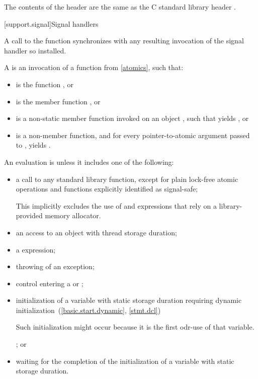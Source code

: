 \pnum
The contents of the header  are the same as the C
standard library header .

[support.signal]{Signal handlers}

\pnum
A call to the function  synchronizes with any resulting
invocation of the signal handler so installed.

\pnum
A  is
an invocation of a function  from \ref{atomics},
such that:
\begin{itemize}
\item
{} is the function , or

\item
{} is the member function , or

\item
{} is a non-static member function invoked on an object ,
such that  yields , or

\item
{} is a non-member function, and
for every pointer-to-atomic argument  passed to ,
 yields .
\end{itemize}

\pnum
{}%
An evaluation is  unless it includes one of the following:
\begin{itemize}
\item
a call to any standard library function,
except for plain lock-free atomic operations and
functions explicitly identified as signal-safe;
\begin{note}
This implicitly excludes the use of  and  expressions
that rely on a library-provided memory allocator.
\end{note}

\item
an access to an object with thread storage duration;

\item
a  expression;

\item
throwing of an exception;

\item
control entering a  or ;

\item
initialization of a variable with static storage duration
requiring dynamic initialization~(\ref{basic.start.dynamic}, \ref{stmt.dcl})
\begin{footnote}
Such initialization might occur because it is the first odr-use of that variable.
\end{footnote}%
; or

\item
waiting for the completion of the initialization of a variable with static storage duration.
\end{itemize}

